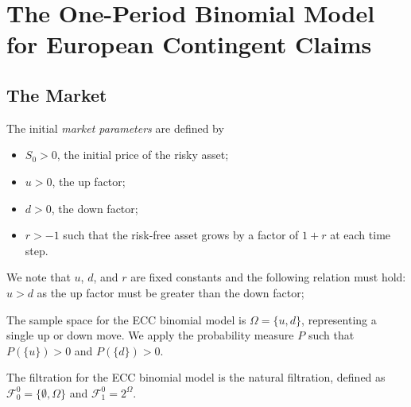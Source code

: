 %

\chapter{The One-Period Binomial Model for European Contingent Claims}

\section{The Market}

\begin{definition}\label{def:parameters}
    \uses{}
    The initial \emph{market parameters} are defined by
    \begin{itemize}
        \item $S_0 > 0$, the initial price of the risky asset;
        \item $u > 0$, the up factor;
        \item $d > 0$, the down factor;
        \item $r > -1$ such that the risk-free asset grows by a factor of $1 + r$ at each time step.
    \end{itemize}
    We note that $u$, $d$, and $r$ are fixed constants and the following relation must hold:
    $u > d$ as the up factor must be greater than the down factor;
\end{definition}

\begin{definition}\label{def:sample_space}
    The sample space for the ECC binomial model is $\Omega = \{u, d\}$, representing a single up or down move.
    We apply the probability measure $P$ such that $P(\{u\}) > 0$ and $P(\{d\}) > 0$.
\end{definition}

\begin{definition}\label{def:binomial_filtration}
    \leanok
    The filtration for the ECC binomial model is the natural filtration, defined as $\mathcal{F}^0_0 = \{\emptyset, \Omega\}$ and $\mathcal{F}^0_1 = 2^\Omega$.
\end{definition}

